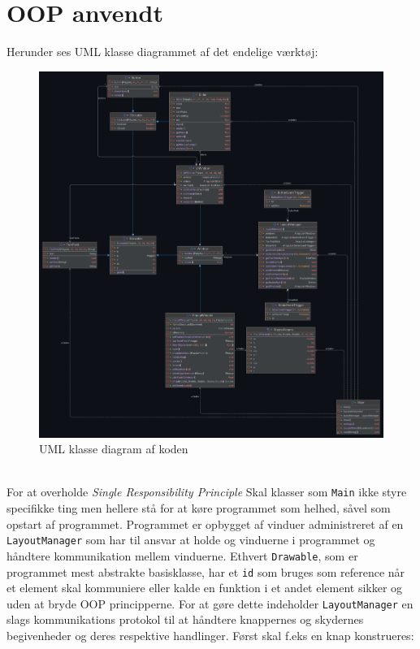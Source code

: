 \documentclass{article}
\begin{document}
\section{OOP anvendt}
Herunder ses UML klasse diagrammet af det endelige værktøj:
\begin{figure}[!h]
    \centering
    \includegraphics[width=1\linewidth]{Main.png}
    \caption{UML klasse diagram af koden}
    \label{fig:enter-label}
\end{figure}\\
For at overholde \textit{Single Responsibility Principle} Skal klasser som \texttt{Main} ikke styre specifikke ting men hellere stå for at køre programmet som helhed, såvel som opstart af programmet. Programmet er opbygget af vinduer administreret af en \texttt{LayoutManager} som har til ansvar at holde og vinduerne i programmet og håndtere kommunikation mellem vinduerne. Ethvert \texttt{Drawable}, som er programmet mest abstrakte basisklasse, har et \texttt{id} som bruges som reference når et element skal kommuniere eller kalde en funktion i et andet element sikker og uden at bryde OOP principperne. For at gøre dette indeholder \texttt{LayoutManager} en slags kommunikations protokol til at håndtere knappernes og skydernes begivenheder og deres respektive handlinger. Først skal f.eks en knap konstrueres:
\end{document}

